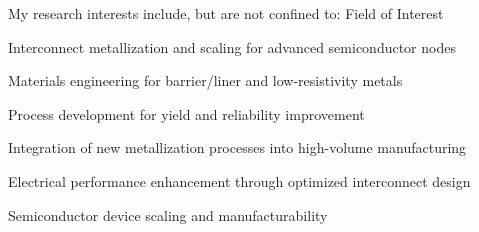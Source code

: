  \cventry
  {My research interests include, but are not confined to:} %
  {Field of Interest}%
  {} %
  {} %
  {
    \begin{cvitems} %
      \item {Interconnect metallization and scaling for advanced semiconductor nodes\lineintv}
      \item {Materials engineering for barrier/liner and low-resistivity metals\lineintv}
      \item {Process development for yield and reliability improvement\lineintv}
      \item {Integration of new metallization processes into high-volume manufacturing\lineintv}
      \item {Electrical performance enhancement through optimized interconnect design\lineintv}
      \item {Semiconductor device scaling and manufacturability\lineintv}
    \end{cvitems}
  }


